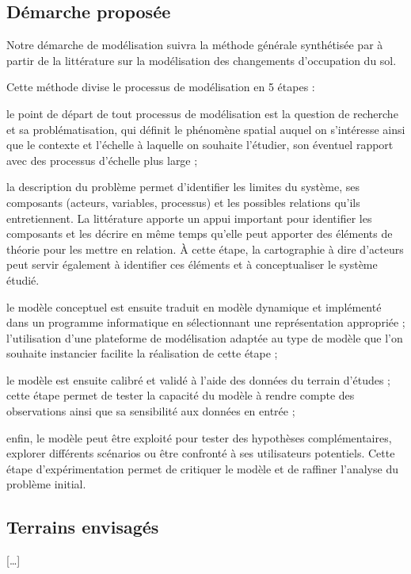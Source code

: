 \subsection{Démarche proposée}

Notre démarche de modélisation suivra la méthode générale synthétisée par \citet{magliocca_metastudies_2015}
à partir de la littérature sur la modélisation des changements d'occupation du sol.

\startplacefigure[location=middle,title={Processus de modélisation}]
\stopplacefigure

Cette méthode divise le processus de modélisation en 5 étapes :

\startitemize[n]

\item le point de départ de tout processus de modélisation
   est la question de recherche et sa problématisation,
   qui définit le phénomène spatial auquel on s'intéresse
   ainsi que le contexte et l'échelle à laquelle on souhaite l'étudier,
   son éventuel rapport avec des processus d'échelle plus large ;

\item la description du problème permet d'identifier les limites du système,
   ses composants (acteurs, variables, processus)
   et les possibles relations qu'ils entretiennent.
   La littérature apporte
   un appui important pour identifier les composants et
   les décrire en même temps qu'elle peut apporter
   des éléments de théorie pour les mettre en relation.
   À cette étape, la cartographie à dire d'acteurs peut
   servir également à identifier ces éléments et à conceptualiser
   le système étudié.

\item le modèle conceptuel est ensuite traduit en modèle dynamique
   et implémenté dans un programme informatique
   en sélectionnant une représentation appropriée ;
   l'utilisation d'une plateforme de modélisation
   adaptée au type de modèle que l'on souhaite instancier
   facilite la réalisation de cette étape ;

\item le modèle est ensuite calibré et validé à l'aide des données
   du terrain d'études ; cette étape permet de tester la capacité
   du modèle à rendre compte des observations ainsi
   que sa sensibilité aux données en entrée ;

\item enfin, le modèle peut être exploité pour
   tester des hypothèses complémentaires, explorer
   différents scénarios ou être confronté à
   ses utilisateurs potentiels. Cette étape d'expérimentation
   permet de critiquer le modèle et de raffiner l'analyse du
   problème initial.

\stopitemize

\subsection{Terrains envisagés}

[\dots]
%